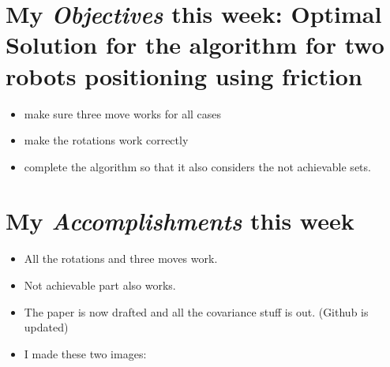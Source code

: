\newcommand{\handoutName}{Weekly report}
\newcommand{\handoutdate}{\today}


\section{My \emph{Objectives} this week: Optimal Solution for the algorithm for two robots positioning using friction}
\begin{itemize}
\item make sure three move works for all cases
\item make the rotations work correctly
\item complete the algorithm so that it also considers the not achievable sets.
\end{itemize}



\section{My \emph{Accomplishments} this week}


\begin{itemize}
\item All the rotations and three moves work.
\item Not achievable part also works.
\item The paper is now drafted and all the covariance stuff is out. (Github is updated)
\item I made these two images:
\end{itemize}

